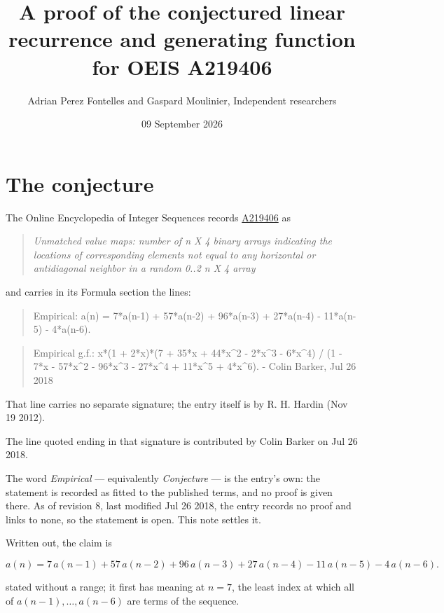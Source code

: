 \documentclass[11pt]{article}
\title{A proof of the conjectured linear recurrence and generating function for OEIS A219406}
\author{Adrian Perez Fontelles and Gaspard Moulinier, Independent researchers}
\date{09 September 2026}
\theoremstyle{definition}
\begin{document}
\maketitle
\section{The conjecture}

The Online Encyclopedia of Integer Sequences records \href{https://oeis.org/A219406}{A219406} as

\begin{quote}\itshape Unmatched value maps: number of n X 4 binary arrays indicating the locations of corresponding elements not equal to any horizontal or antidiagonal neighbor in a random 0..2 n X 4 array\end{quote}

and carries in its Formula section the lines:

\begin{quote}\ttfamily Empirical: a(n) = 7*a(n-1) + 57*a(n-2) + 96*a(n-3) + 27*a(n-4) - 11*a(n-5) - 4*a(n-6).\end{quote}

\begin{quote}\ttfamily Empirical g.f.: x*(1 + 2*x)*(7 + 35*x + 44*x\textasciicircum{}2 - 2*x\textasciicircum{}3 - 6*x\textasciicircum{}4) / (1 - 7*x - 57*x\textasciicircum{}2 - 96*x\textasciicircum{}3 - 27*x\textasciicircum{}4 + 11*x\textasciicircum{}5 + 4*x\textasciicircum{}6). - Colin Barker, Jul 26 2018\end{quote}

That line carries no separate signature; the entry itself is by R. H. Hardin (Nov 19 2012).

The line quoted ending in that signature is contributed by Colin Barker on Jul 26 2018.

The word {\itshape Empirical} --- equivalently {\itshape Conjecture} --- is the entry's own: the statement is recorded as fitted to the published terms, and no proof is given there. As of revision 8, last modified Jul 26 2018, the entry records no proof and links to none, so the statement is open. This note settles it.

Written out, the claim is

\[a(n) = 7\,a(n-1) + 57\,a(n-2) + 96\,a(n-3) + 27\,a(n-4) - 11\,a(n-5) - 4\,a(n-6).\]

stated without a range; it first has meaning at $n = 7$, the least index at which all of $a(n-1),\dots,a(n-6)$ are terms of the sequence.
\end{document}
